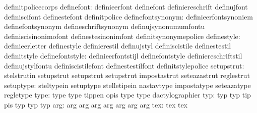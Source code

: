                                   definitpolicecorps
                      definefont: definieerfont                    definefont
                                  definiereschrift                 definujfont
                                  definiscifont                    definestefont
                                  definitpolice
               definefontsynonym: definieerfontsynoniem            definefontsynonym
                                  defineschriftsynonym             definujsynonumumfontu
                                  definiscisinonimofont            definestesinonimfont
                                  definitsynonymepolice
                     definestyle: definieerletter                  definestyle
                                  definierestil                    definujstyl
                                  definiscistile                   definestestil
                                  definitstyle
                 definefontstyle: definieerfontstijl               definefontstyle
                                  definiereschriftstil             definujstylfontu
                                  definiscistilefont               definestestilfont
                                  definitstylepolice
                      setupstrut: stelstrutin                      setupstrut
                                  setupstrut                       setupstrut
                                  impostastrut                     seteazastrut
                                  reglestrut
                       setuptype: steltypein                       setuptype
                                  stelletipein                     nastavtype
                                  impostatype                      seteazatype
                                  regletype
                            type: type                             type
                                  tippen                           opis
                                  type                             type
                                  dactylographier
                             typ: typ                              typ
                                  tip                              pis
                                  typ                              typ
                                  typ
                             arg: arg                              arg
                                  arg                              arg
                                  arg                              arg
                                  arg
                             tex: tex                              tex
